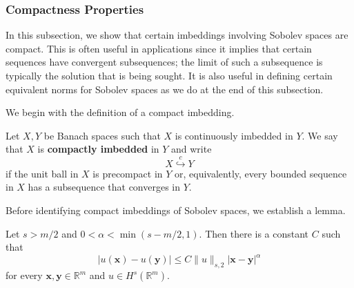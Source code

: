 \subsubsection{Compactness Properties}\label{subsec:sobolev-compactness-properties}

In this subsection, we show that certain imbeddings involving Sobolev spaces are compact. This is often useful in applications since it implies that certain sequences have convergent subsequences; the limit of such a subsequence is typically the solution that is being sought. It is also useful in defining certain equivalent norms for Sobolev spaces as we do at the end of this subsection.

We begin with the definition of a compact imbedding.

\begin{Definition}
\label{def:compact-imbedding}
Let $X,Y$ be Banach spaces such that $X$ is continuously imbedded in $Y$. We say that $X$ is \textbf{compactly imbedded} in $Y$ and write\[X\overset{c}{\hookrightarrow}Y\]if the unit ball in $X$ is precompact in $Y$ or, equivalently, every bounded sequence in $X$ has a subsequence that converges in $Y$.
\end{Definition}

Before identifying compact imbeddings of Sobolev spaces, we establish a lemma.

\begin{Lemma}
\label{lem:sobolev-holder-continuity}
Let $s>m/2$ and $0<\alpha<\min(s-m/2,1)$. Then there is a constant $C$ such that
\begin{equation}\label{eq:sobolev-holder-continuity-estimate}
|u(\bm{x})-u(\bm{y})|\leq C\|u\|_{s,2}|\bm{x}-\bm{y}|^{\alpha}
\end{equation}
for every $\bm{x},\bm{y}\in\mathbb{R}^m$ and $u\in H^s(\mathbb{R}^m)$.
\end{Lemma}

